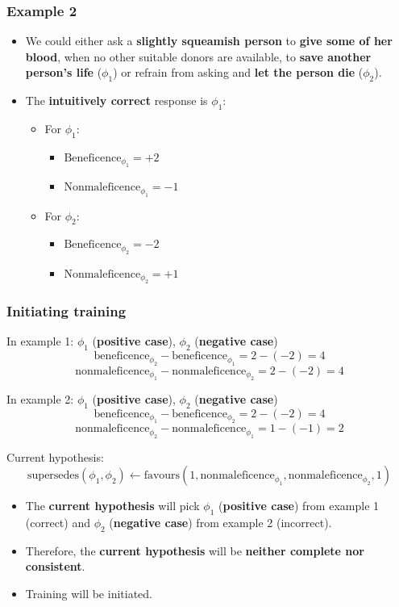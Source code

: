 \documentclass[11pt]{article}
\begin{document}
\subsubsection{Example 2}
\label{sec:org8d5052a}
\begin{itemize}
\item We could either ask a \textbf{slightly squeamish person} to \textbf{give some of her blood}, when no other suitable donors are available, to \textbf{save another person's life} (\(\phi_1\)) or refrain from asking and \textbf{let the person die} (\(\phi_2\)).
\item The \textbf{intuitively correct} response is \(\phi_1\):
\begin{itemize}
\item For \(\phi_1\):
\begin{itemize}
\item \(\text{Beneficence}_{\phi_1} = + 2\)
\item \(\text{Nonmaleficence}_{\phi_1} = - 1\)
\end{itemize}
\item For \(\phi_2\):
\begin{itemize}
\item \(\text{Beneficence}_{\phi_2} = - 2\)
\item \(\text{Nonmaleficence}_{\phi_2} = + 1\)
\end{itemize}
\end{itemize}
\end{itemize}
\subsubsection{Initiating training}
\label{sec:orgc32c867}
In example 1:
\(\phi_1\) (\textbf{positive case}), \(\phi_2\) (\textbf{negative case})
\[\text{beneficence}_{\phi_2} - \text{beneficence}_{\phi_1} = 2 - (-2) = 4\]
\[\text{nonmaleficence}_{\phi_1} - \text{nonmaleficence}_{\phi_2} = 2 - (-2) = 4\]

In example 2:
\(\phi_1\) (\textbf{positive case}), \(\phi_2\) (\textbf{negative case})
\[\text{beneficence}_{\phi_1} - \text{beneficence}_{\phi_2} = 2 - (-2) = 4\]
\[\text{nonmaleficence}_{\phi_2} - \text{nonmaleficence}_{\phi_1} = 1 - (-1) = 2\]

Current hypothesis:
\[\text{supersedes}(\phi_1, \phi_2) \leftarrow \text{favours}(1, \text{nonmaleficence}_{\phi_1}, \text{nonmaleficence}_{\phi_2}, 1)\]
\begin{itemize}
\item The \textbf{current hypothesis} will pick \(\phi_1\) (\textbf{positive case}) from example 1 (correct) and \(\phi_2\) (\textbf{negative case}) from example 2 (incorrect).
\item Therefore, the \textbf{current hypothesis} will be \textbf{neither complete nor consistent}.
\item Training will be initiated.
\end{itemize}
\end{document}
